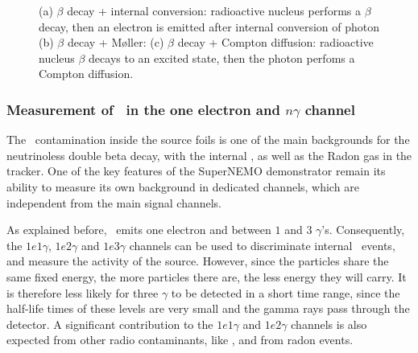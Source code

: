 \begin{figure}[!h]
\begin{subfigure}[t]{0.32\textwidth}
  \captionsetup{justification=justified}
  \caption{
    \label{subfig:cont_Pint_ROI}}
\end{subfigure}
\caption{(a) $\beta$ decay + internal conversion: radioactive nucleus performs a $\beta$ decay, then an electron is emitted after internal conversion of photon
    (b) $\beta$ decay + M\o{}ller:
    (c) $\beta$ decay + Compton diffusion: radioactive nucleus $\beta$ decays to an excited state, then the photon perfoms a Compton diffusion.
  \label{fig:internal_contamination}}
\end{figure}

\subsubsection{Measurement of \Tl\ in the one electron and $n\gamma$ channel}

The \Tl\ contamination inside the source foils is one of the main backgrounds for the neutrinoless double beta decay, with the internal \Bi, as well as the Radon gas in the tracker.
One of the key features of the SuperNEMO demonstrator remain its ability to measure its own background in dedicated channels, which are independent from the main signal channels.

As explained before, \Tl\ emits one electron and between $1$ and $3$ $\gamma$’s.
Consequently, the $1e1\gamma$, $1e2\gamma$ and $1e3\gamma$ channels can be used to discriminate internal \Tl\ events, and measure the activity of the source.
However, since the particles share the same fixed energy, the more particles there are, the less energy they will carry.
It is therefore less likely for three $\gamma$ to be detected in a short time range, since the half-life times of these levels are very small and the gamma rays pass through the detector.
A significant contribution to the $1e1\gamma$ and $1e2\gamma$ channels is also expected from other radio contaminants, like \Bi, and from radon events.

